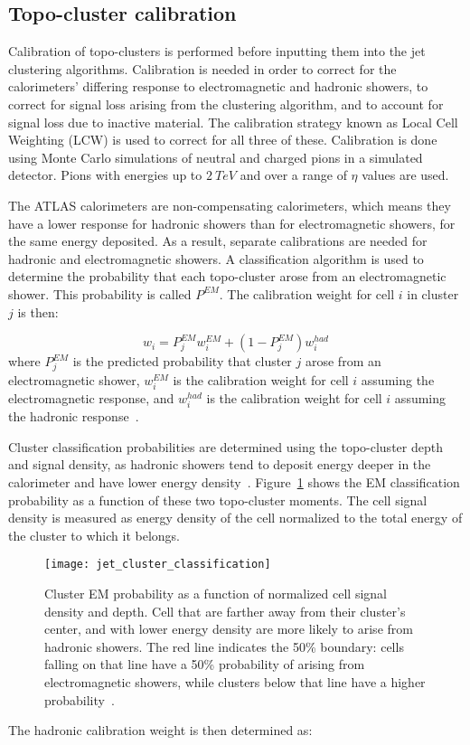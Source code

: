 \subsection{Topo-cluster calibration}\label{subsec:topo_calibration}

Calibration of topo-clusters is performed before inputting them into the jet clustering algorithms.
Calibration is needed in order to correct for the calorimeters' differing response to electromagnetic and hadronic showers, to correct for signal loss arising from the clustering algorithm, and to account for signal loss due to inactive material.
The calibration strategy known as Local Cell Weighting (LCW) is used to correct for all three of these.
Calibration is done using Monte Carlo simulations of neutral and charged pions in a simulated detector.
Pions with energies up to $2~TeV$ and over a range of $\eta$ values are used.

The ATLAS calorimeters are non-compensating calorimeters, which means they have a lower response for hadronic showers than for electromagnetic showers, for the same energy deposited.
As a result, separate calibrations are needed for hadronic and electromagnetic showers.
A classification algorithm is used to determine the probability that each topo-cluster arose from an electromagnetic shower.
This probability is called $P^{EM}$.
The calibration weight for cell $i$ in cluster $j$ is then:

\begin{equation}\label{eq:lcw_weights}
    w_i = P_{j}^{EM}w_i^{EM}+\left(1-P^{EM}_j\right)w_i^{had}
\end{equation}
where $P_j^{EM}$ is the predicted probability that cluster $j$ arose from an electromagnetic shower, $w_{i}^{EM}$ is the calibration weight for cell $i$ assuming the electromagnetic response, and $w_{i}^{had}$ is the calibration weight for cell $i$ assuming the hadronic response~\cite{jet-topo-cluster}.

Cluster classification probabilities are determined using the topo-cluster depth and signal density, as hadronic showers tend to deposit energy deeper in the calorimeter and have lower energy density~\cite{jet-topo-cluster}.
Figure~\ref{fig:jet_cluster_classification} shows the EM classification probability as a function of these two topo-cluster moments.
The cell signal density is measured as energy density of the cell normalized to the total energy of the cluster to which it belongs.

\begin{figure}[!ht]
    \centering
\texttt{[image: jet\_cluster\_classification]}
\caption{Cluster EM probability as a function of normalized cell signal density and depth.
Cell that are farther away from their cluster's center, and with lower energy density are more likely to arise
from hadronic showers.
The red line indicates the 50\% boundary: cells falling on that line have a 50\% probability of arising from
electromagnetic showers, while clusters below that line have a higher probability~\cite{jet-topo-cluster}.}
\label{fig:jet_cluster_classification}
\end{figure}
The hadronic calibration weight is then determined as:

